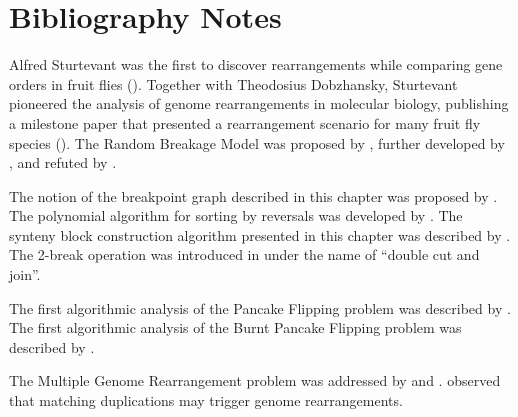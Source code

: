 \FloatBarrier
\section{Bibliography Notes}
\label{sec:rearrangements_bibliography_notes}

Alfred Sturtevant was the first to discover rearrangements while comparing gene orders in fruit flies (\cite{sturtevant_1921}). Together with Theodosius Dobzhansky, Sturtevant pioneered the analysis of genome rearrangements in molecular biology, publishing a milestone paper that presented a rearrangement scenario for many fruit fly species (\cite{sturtevant_dobzhansky_1936}).  The Random Breakage Model was proposed by \cite{ohno_1973}, further developed by \cite{nadeau_taylor_1984}, and refuted by \cite{pevzner_tesler_2003a}.

The notion of the breakpoint graph described in this chapter was proposed by \cite{bafna_pevzner_1996}. The polynomial algorithm for sorting by reversals was developed by \cite{hannenhalli_pevzner_1999}. The synteny block construction algorithm presented in this chapter was described by \cite{pevzner_tesler_2003b}. The 2-break operation was introduced in \cite{yancopoulos_2005} under the name of ``double cut and join''.

The first algorithmic analysis of the Pancake Flipping problem was described by \cite{gates_papadimitriou_1979}.  The first algorithmic analysis of the Burnt Pancake Flipping problem was described by \cite{cohen_blum_1995}.

The Multiple Genome Rearrangement problem was addressed by \cite{ma_2008} and \cite{alekseyev_pevzner_2009}. \cite{zhao_bourque_2009} observed that matching  duplications may trigger genome rearrangements.